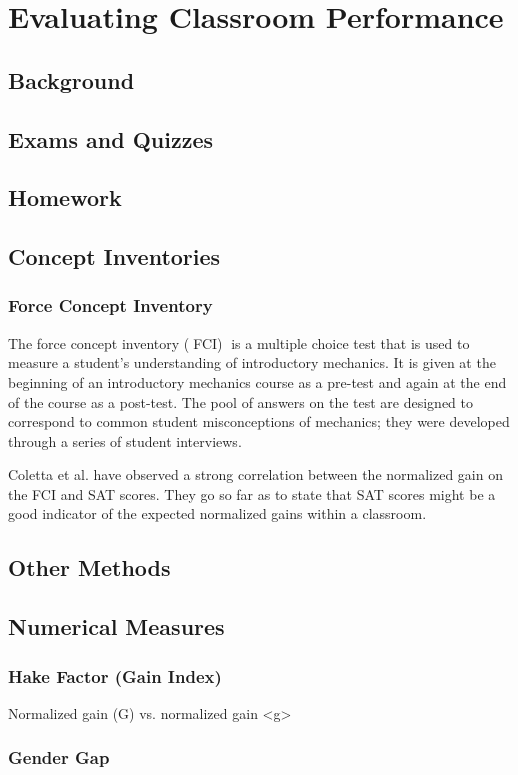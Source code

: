 \chapter[Chapter 4: Evaluating Classroom Performance]{Evaluating Classroom Performance}

\section{Background}

\section{Exams and Quizzes}

\section{Homework}

\section{Concept Inventories}

\subsection{Force Concept Inventory}

The force concept inventory (􏰀FCI)􏰁 is a multiple choice test that is used to measure a student's understanding of introductory mechanics. It is given at the beginning of an introductory mechanics course as a pre-test and again at the end of the course as a post-test. The pool of answers on the test are designed to correspond to common student misconceptions of mechanics; they were developed through a series of student interviews\cite{hestenes1992}.

Coletta et al. have observed a strong correlation between the normalized gain on the FCI and SAT scores. They go so far as to state that SAT scores might be a good indicator of the expected normalized gains within a classroom\cite{coletta2007}.

\section{Other Methods}

\section{Numerical Measures}

\subsection{Hake Factor (Gain Index)}

Normalized gain (G) vs. normalized gain <g>

\subsection{Gender Gap}